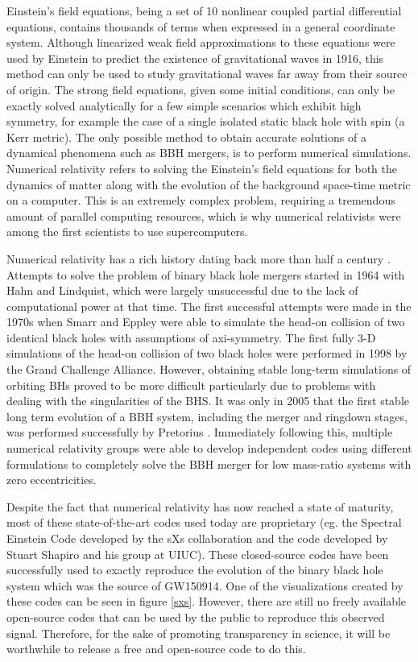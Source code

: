 \documentclass[aps,twocolumn,secnumarabic,nobalancelastpage,amsmath,amssymb,
nofootinbib]{revtex4}
\begin{document}
	
	Einstein's field equations, being a set of 10 nonlinear coupled partial differential equations, contains thousands of terms when expressed in a general coordinate system. Although linearized weak field approximations to these equations were used by Einstein to predict the existence of gravitational waves in 1916, this method can only be used to study gravitational waves far away from their source of origin. The strong field equations, given some initial conditions, can only be exactly solved analytically for a few simple scenarios which exhibit high symmetry, for example the case of a single isolated static black hole with spin (a Kerr metric). The only possible method to obtain accurate solutions of a dynamical phenomena such as BBH mergers, is to perform numerical simulations. Numerical relativity refers to solving the Einstein's field equations for both the dynamics of matter along with the evolution of the background space-time metric on a computer. This is an extremely complex problem, requiring a tremendous amount of parallel computing resources, which is why numerical relativists were among the first scientists to use supercomputers.
		\newline
	
	 Numerical relativity has a rich history dating back more than half a century \cite{living}. Attempts to solve the problem of binary black hole mergers started in 1964 with Hahn and Lindquist, which were largely unsuccessful due to the lack of computational power at that time. The first successful attempts were made in the 1970s when Smarr and Eppley were able to simulate the head-on collision of two identical black holes with assumptions of axi-symmetry. The first fully 3-D simulations of the head-on collision of two black holes were performed in 1998 by the Grand Challenge Alliance. However, obtaining stable long-term simulations of orbiting BHs proved to be more difficult particularly due to problems with dealing with the singularities of the BHS. It was only in 2005 that the first stable long term evolution of a BBH system, including the merger and ringdown stages, was performed successfully by Pretorius \cite{pret}. Immediately following this, multiple numerical relativity groups were able to develop independent codes using different formulations to completely solve the BBH merger for low mass-ratio systems with zero eccentricities.
		\newline
		
	Despite the fact that numerical relativity has now reached a state of maturity, most of these state-of-the-art codes used today are proprietary (eg. the Spectral Einstein Code developed by the sXs collaboration \cite{sxs} and the code developed by Stuart Shapiro and his group at UIUC). These closed-source codes have been successfully used to exactly reproduce the evolution of the binary black hole system which was the source of GW150914. One of the visualizations created by these codes can be seen in figure \ref{sxs}. However, there are still no freely available open-source codes that can be used by the public to reproduce this observed signal. Therefore, for the sake of promoting transparency in science, it will be worthwhile to release a free and open-source code to do this.
		\newline
	
\end{document}
